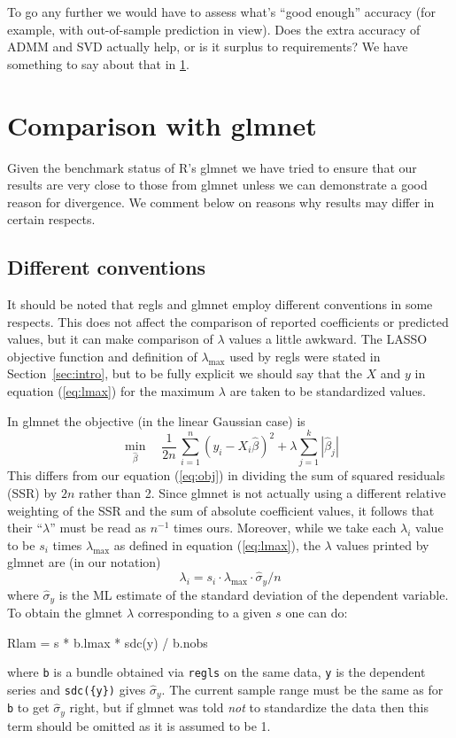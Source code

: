 \documentclass{article}
\newcommand{\myappendix}[1]{%
\addtocounter{appcount}{1}
\section{#1}}
\begin{document}
To go any further we would have to assess what's ``good enough''
accuracy (for example, with out-of-sample prediction in view). Does
the extra accuracy of ADMM and SVD actually help, or is it surplus to
requirements? We have something to say about that in
\ref{app:glmnet-comp}.

\myappendix{Comparison with glmnet}
\label{app:glmnet-comp}

Given the benchmark status of \textsf{R}'s \textsf{glmnet} we have
tried to ensure that our results are very close to those from
\textsf{glmnet} unless we can demonstrate a good reason for
divergence. We comment below on reasons why results may differ in
certain respects.

\subsection*{Different conventions}

It should be noted that \textsf{regls} and \textsf{glmnet} employ
different conventions in some respects. This does not affect the
comparison of reported coefficients or predicted values, but it can
make comparison of $\lambda$ values a little awkward. The LASSO
objective function and definition of $\lambda_{\max}$ used by
\textsf{regls} were stated in Section~\ref{sec:intro}, but to be fully
explicit we should say that the $X$ and $y$ in equation
(\ref{eq:lmax}) for the maximum $\lambda$ are taken to be standardized
values.

In \textsf{glmnet} the objective (in the linear Gaussian case) is
\[
   \min_{\hat{\beta}} \quad \frac{1}{2n}\,
  \sum_{i=1}^n (y_i - X_i\hat{\beta})^2 + \lambda \sum_{j=1}^k |\hat{\beta}_j|
\]
This differs from our equation (\ref{eq:obj}) in dividing the sum of
squared residuals (SSR) by $2n$ rather than 2. Since \textsf{glmnet}
is not actually using a different relative weighting of the SSR and
the sum of absolute coefficient values, it follows that their
``$\lambda$'' must be read as $n^{-1}$ times ours. Moreover, while we
take each $\lambda_i$ value to be $s_i$ times $\lambda_{\max}$ as
defined in equation (\ref{eq:lmax}), the $\lambda$ values printed by
\textsf{glmnet} are (in our notation)
\[
\lambda_i = s_i \cdot \lambda_{\max} \cdot \hat{\sigma}_y / n
\]
where $\hat{\sigma}_y$ is the ML estimate of the standard deviation of
the dependent variable. To obtain the \textsf{glmnet} $\lambda$
corresponding to a given $s$ one can do:
\begin{code}
Rlam = s * b.lmax * sdc({y}) / b.nobs
\end{code}
where \texttt{b} is a bundle obtained via \texttt{regls} on the same
data, \texttt{y} is the dependent series and \texttt{sdc(\{y\})} gives
$\hat{\sigma}_y$. The current sample range must be the same as for
\texttt{b} to get $\hat{\sigma}_y$ right, but if \textsf{glmnet} was
told \textit{not} to standardize the data then this term should be
omitted as it is assumed to be 1.
\end{document}
